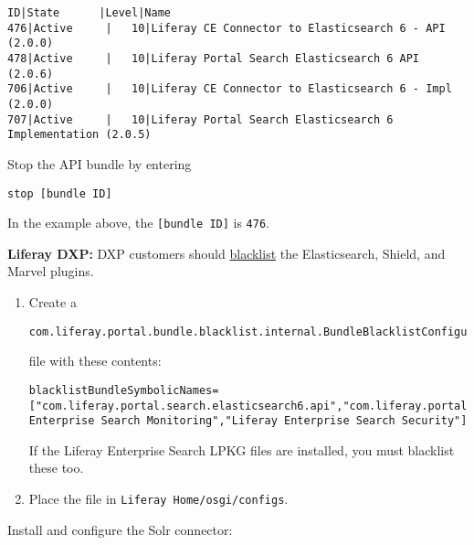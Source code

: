 \begin{verbatim}
ID|State      |Level|Name
476|Active     |   10|Liferay CE Connector to Elasticsearch 6 - API (2.0.0)
478|Active     |   10|Liferay Portal Search Elasticsearch 6 API (2.0.6)
706|Active     |   10|Liferay CE Connector to Elasticsearch 6 - Impl (2.0.0)
707|Active     |   10|Liferay Portal Search Elasticsearch 6 Implementation (2.0.5)
\end{verbatim}

Stop the API bundle by entering

\begin{verbatim}
stop [bundle ID]
\end{verbatim}

In the example above, the \texttt{{[}bundle\ ID{]}} is \texttt{476}.

\noindent\hrulefill

\textbf{Liferay DXP:} DXP customers should
\href{/docs/7-1/user/-/knowledge_base/u/blacklisting-osgi-modules-and-components}{blacklist}
the Elasticsearch, Shield, and Marvel plugins.

\begin{enumerate}
\def\labelenumi{\arabic{enumi}.}
\item
  Create a

\begin{verbatim}
com.liferay.portal.bundle.blacklist.internal.BundleBlacklistConfiguration.config
\end{verbatim}

  file with these contents:

\begin{verbatim}
blacklistBundleSymbolicNames=["com.liferay.portal.search.elasticsearch6.api","com.liferay.portal.search.elasticsearch6.impl","Liferay Enterprise Search Monitoring","Liferay Enterprise Search Security"]
\end{verbatim}

  If the Liferay Enterprise Search LPKG files are installed, you must
  blacklist these too.
\item
  Place the file in \texttt{Liferay\ Home/osgi/configs}.
\end{enumerate}

\noindent\hrulefill

Install and configure the Solr connector:

